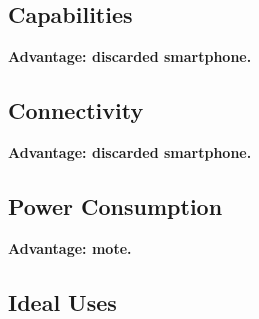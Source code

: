 \subsection{Capabilities}

\textbf{Advantage: discarded smartphone.}

\subsection{Connectivity}

\textbf{Advantage: discarded smartphone.}

\subsection{Power Consumption}

\textbf{Advantage: mote.}

\subsection{Ideal Uses}
